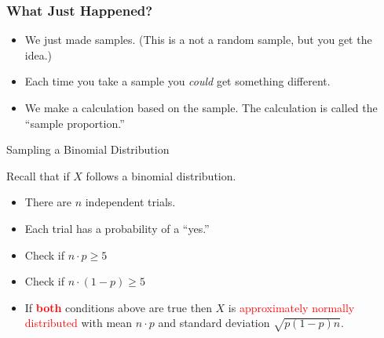 \begin{frame}
  \frametitle{What Just Happened?}

  \begin{itemize}
  \item We just made samples. (This is a not a random sample, but you
    get the idea.)

  \item Each time you take a sample you \textit{could} get something
    different.

  \item We make a calculation based on the sample. The calculation is
    called the ``sample proportion.''


  \end{itemize}

  \vfill


\end{frame}

\begin{frame}{Sampling a Binomial Distribution}

  Recall that if $X$ follows a binomial distribution. 
  \begin{itemize}
  \item There are $n$ independent trials.
  \item Each trial has a probability of a ``yes.''
  \item Check if $n\cdot p \geq 5$ 
  \item Check if $n\cdot (1-p) \geq 5$ 
  \item If \textcolor{red}{\textbf{both}} conditions above are true
    then $X$ is \textcolor{red}{approximately normally distributed}
    with mean $n\cdot p$ and standard deviation $\sqrt{p(1-p)n}$.
  \end{itemize}

  
\end{frame}


